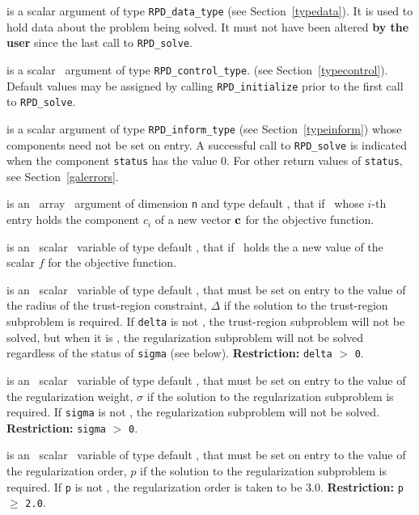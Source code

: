 \documentclass{galahad}
\newcommand{\packagename}{RPD}
\begin{document}
\begin{description}
\begin{description}
 is a scalar \intentinout argument of type
{\tt \packagename\_data\_type}
(see Section~\ref{typedata}). It is used to hold data about the problem being
solved. It must not have been altered {\bf by the user} since the last call to
{\tt \packagename\_solve}.

 is a scalar \intentin\ argument of type
{\tt \packagename\_control\_type}.
(see Section~\ref{typecontrol}).
Default values may be assigned by calling {\tt \packagename\_initialize}
prior to the first call to {\tt \packagename\_solve}.

 is a scalar \intentinout argument of type
{\tt \packagename\_inform\_type}
(see Section~\ref{typeinform}) whose components need not be set on entry.
A successful call to
{\tt \packagename\_solve}
is indicated when the  component {\tt status} has the value 0.
For other return values of {\tt status}, see Section~\ref{galerrors}.

 is an \optional\ array \intentin\ argument of dimension {\tt n} and
type default \realdp, that if \present\ whose $i$-th entry holds the
component $c_i$ of a new vector ${\mathbf{c}}$ for the objective function.

 is an \optional\ scalar \intentin\ variable of type default \realdp,
that if \present\ holds the a new value of the scalar
$f$ for the objective function.

 is an \optional\ scalar \intentin\ variable of type default
\realdp, that must be set on entry
to the value of the radius of the trust-region constraint, $\Delta$
if the solution to the trust-region subproblem  is required.
If {\tt delta} is not \present, the trust-region subproblem will not be
solved, but when it is \present, the regularization subproblem will not be
solved regardless of the status of {\tt sigma} (see below).
{\bf Restriction: } {\tt delta} $>$ {\tt 0}.

 is an \optional\ scalar \intentin\ variable of type default
\realdp, that must be set on entry
to the value of the regularization weight, $\sigma$
if the solution to the regularization subproblem  is required.
If {\tt sigma} is not \present, the regularization subproblem will not be
solved.
{\bf Restriction: } {\tt sigma} $>$ {\tt 0}.

 is an \optional\ scalar \intentin\ variable of type default
\realdp, that must be set on entry
to the value of the regularization order, $p$
if the solution to the regularization subproblem  is required.
If {\tt p} is not \present, the regularization order is taken to be
$3.0$.
{\bf Restriction: } {\tt p} $\geq$ {\tt 2.0}.



\end{description}
\end{description}
\end{document}
